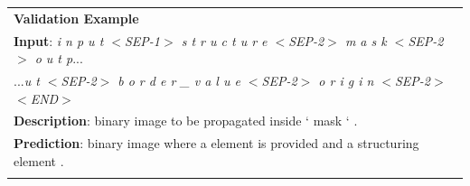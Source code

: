 \begin{table}
\begin{center}
\begin{tabular}{l}

\hline
\textbf{Validation Example}\\

\textbf{Input}: \textit{i n p u t $<$SEP-1$>$ s t r u c t u r e $<$SEP-2$>$ m a s k $<$SEP-2$>$ o u t p}...\\
...\textit{u t $<$SEP-2$>$ b o r d e r \_ v a l u e $<$SEP-2$>$ o r i g i n $<$SEP-2$>$ $<$END$>$}\\
\textbf{Description}: binary image to be propagated inside ` mask ` .\\
\textbf{Prediction}: binary image where a element is provided and a structuring element . \\

\\\hline








\end{tabular}
\end{center}
\end{table}
